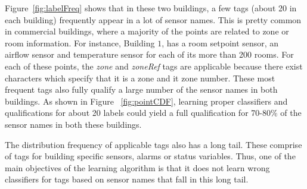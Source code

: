 Figure~\ref{fig:labelFreq} shows that in  these two buildings, a few tags (about 20 in each building) frequently appear in a lot of sensor names. This is pretty common in commercial buildings, where a majority of the points are related to zone or room information. For instance, Building $1$, has a room setpoint sensor, an airflow sensor and temperature sensor for each of its more than 200 rooms. For each of these points, the {\it zone} and {\it zoneRef} tags are applicable because there exist characters which specify that it is a zone and it zone number. These most frequent tags also fully qualify a large number of the sensor names in both buildings. As shown in Figure ~\ref{fig:pointCDF},  learning proper classifiers and qualifications for about 20 labels could yield a full qualification for 70-80\% of the sensor names in both these buildings.

The distribution frequency of applicable tags also has a long tail. These comprise of tags for building specific sensors, alarms or status variables. Thus, one of the main objectives of the learning algorithm is that it does not learn wrong classifiers for tags based on sensor names that fall in this long tail.

